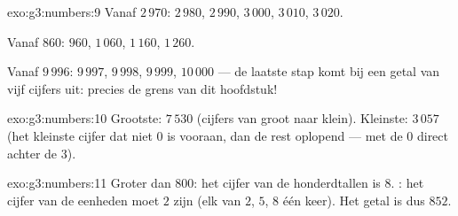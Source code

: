 \begin{solution}{exo:g3:numbers:9}
Vanaf $2\,970$: $2\,980$, $2\,990$, $3\,000$, $3\,010$, $3\,020$.

Vanaf $860$: $960$, $1\,060$, $1\,160$, $1\,260$.

Vanaf $9\,996$: $9\,997$, $9\,998$, $9\,999$, $10\,000$ --- de laatste
stap komt bij een getal van vijf cijfers uit: precies de grens van dit
hoofdstuk!
\end{solution}

\begin{solution}{exo:g3:numbers:10}
Grootste: $7\,530$ (cijfers van groot naar klein). Kleinste: $3\,057$
(het kleinste cijfer dat niet $0$ is vooraan, dan de rest oplopend ---
met de $0$ direct achter de $3$).
\end{solution}

\begin{solution}{exo:g3:numbers:11}
Groter dan $800$: het cijfer van de honderdtallen is $8$. : het
cijfer van de eenheden moet $2$ zijn (elk van $2$, $5$, $8$ één keer).
Het getal is dus $852$.
\end{solution}
